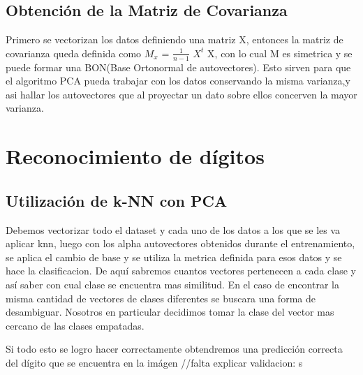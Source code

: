 \subsection{Obtención de la Matriz de Covarianza}
Primero se vectorizan los datos definiendo una matriz X, entonces la matriz de
covarianza queda definida como $M_{x}$ = $\frac{1}{n-1}$ $X^{t}$ X, con lo cual
M es simetrica y se puede formar una BON(Base Ortonormal de autovectores). Esto sirven
para que el algoritmo PCA pueda trabajar con los datos conservando la misma varianza,y asi hallar los autovectores que al proyectar un dato sobre
ellos concerven la mayor varianza.

\section{Reconocimiento de dígitos}

\subsection{Utilización de k-NN con PCA}

Debemos vectorizar todo el dataset y cada uno de los
datos a los que se les va aplicar knn, luego con los alpha autovectores
obtenidos durante el entrenamiento, se aplica el cambio de base y se utiliza la
metrica definida para esos datos y se hace la clasificacion. De aquí sabremos cuantos vectores pertenecen a cada clase y así saber con cual clase se encuentra mas similitud. En el caso de encontrar la misma cantidad de vectores de clases diferentes se buscara una forma de desambiguar. Nosotros en particular decidimos tomar la clase del vector mas cercano de las clases empatadas.

Si todo esto se logro hacer correctamente obtendremos una predicción correcta
del dígito que se encuentra en la imágen
//falta explicar validacion: s 